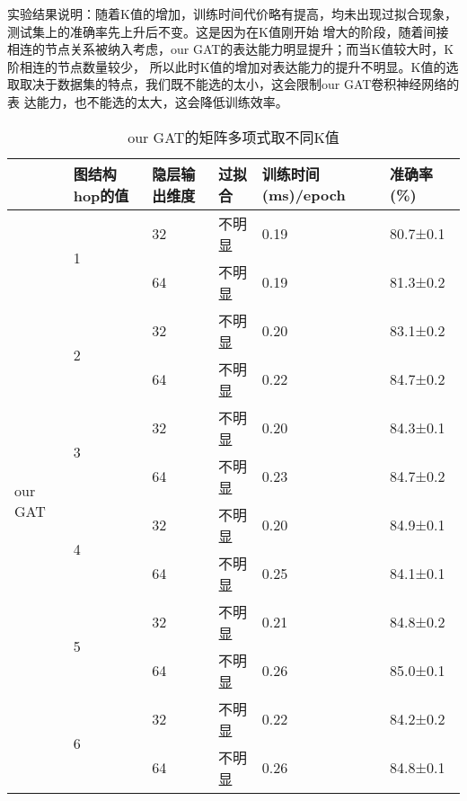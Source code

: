  实验结果说明：随着K值的增加，训练时间代价略有提高，均未出现过拟合现象，测试集上的准确率先上升后不变。这是因为在K值刚开始
 增大的阶段，随着间接相连的节点关系被纳入考虑，our GAT的表达能力明显提升；而当K值较大时，K阶相连的节点数量较少，
 所以此时K值的增加对表达能力的提升不明显。K值的选取取决于数据集的特点，我们既不能选的太小，这会限制our GAT卷积神经网络的表
 达能力，也不能选的太大，这会降低训练效率。

 \begin{table}[]
    \centering
    \caption{our GAT的矩阵多项式取不同K值}
    \label{tabel4-4}
    \begin{tabular}{|l|l|l|l|l|l|}
    \hline
                             & 图结构hop的值      & 隐层输出维度 & 过拟合 & 训练时间(ms)/epoch & 准确率(\%) \\ \hline
    \multirow{12}{*}{our GAT}& \multirow{2}{*}{1} & 32     & 不明显      & 0.19           & 80.7±0.1    \\ \cline{3-6} 
                             &                    & 64     & 不明显      & 0.19           & 81.3±0.2    \\ \cline{2-6} 
                             & \multirow{2}{*}{2} & 32     & 不明显      & 0.20           & 83.1±0.2    \\ \cline{3-6} 
                             &                    & 64     & 不明显      & 0.22           & 84.7±0.2    \\ \cline{2-6} 
                             & \multirow{2}{*}{3} & 32     & 不明显      & 0.20           & 84.3±0.1    \\ \cline{3-6} 
                             &                    & 64     & 不明显      & 0.23           & 84.7±0.2    \\ \cline{2-6}
                             & \multirow{2}{*}{4} & 32     & 不明显      & 0.20           & 84.9±0.1    \\ \cline{3-6} 
                             &                    & 64     & 不明显      & 0.25           & 84.1±0.1    \\ \cline{2-6} 
                             & \multirow{2}{*}{5} & 32     & 不明显      & 0.21           & 84.8±0.2    \\ \cline{3-6} 
                             &                    & 64     & 不明显      & 0.26           & 85.0±0.1    \\ \cline{2-6}  
                             & \multirow{2}{*}{6} & 32     & 不明显      & 0.22           & 84.2±0.2    \\ \cline{3-6} 
                             &                    & 64     & 不明显      & 0.26           & 84.8±0.1    \\ \hline
    \end{tabular}
    \end{table}